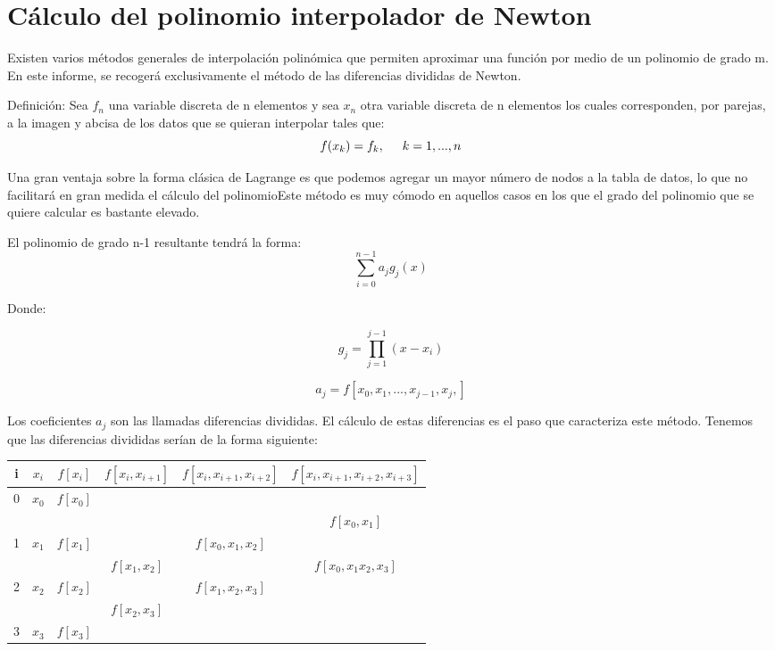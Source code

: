 \section{Cálculo del polinomio interpolador de Newton}
\label{2:sec:2}
  Existen varios métodos generales de interpolación polinómica que permiten aproximar una función por medio de un polinomio de grado m. En este informe, se recogerá exclusivamente el método de las diferencias divididas de Newton.\par Definición: Sea $f_{n}$  una variable discreta de n  elementos y sea $x_{n}$ otra variable discreta de n elementos los cuales corresponden, por parejas, a la imagen y abcisa de los datos que se quieran interpolar tales que:
  \[f(x_{k})=f_{k}, \hspace{0.5 cm} k=1,...,n\]\par
  Una gran ventaja sobre la forma clásica de Lagrange es que podemos agregar un mayor número de nodos a la tabla de datos, lo que no facilitará en gran medida el cálculo del polinomioEste método es muy cómodo en aquellos casos en los que el grado del polinomio que se quiere calcular es bastante elevado.\par El polinomio de grado n-1  resultante tendrá la forma:
  \[\sum_{i=0}^{n-1} {a_j}{g_j}(x)\]\par Donde:\par \[ g_{j}=\prod_{j=1}^{j-1}{(x-x_{i})}\]\par
  \[ a_{j}=f[x_{0},x_{1},...,x_{j-1},x_{j},]\]\par Los coeficientes $a_{j}$ son las llamadas diferencias divididas. El cálculo de estas diferencias es el paso que caracteriza este método. Tenemos que las diferencias divididas serían de la forma siguiente:\par
  
  \begin{tabular}{|c|c|c|c|c|c|}
     \hline
     i & $x_{i}$ & $f[x_{i}]$ & $f[x_{i},x_{i+1}]$ & $f[x_{i}, x_{i+1}, x_{i+2}]$ & $f[x_{i},x_{i+1}, x_{i+2}, x_{i+3}]$ \\
     \hline
     0 & $x_{0}$ & $f[x_{0}]$ & & &\\
       &         &            & & & $f[x_{0},x_{1}]$ \\
     1 & $x_{1}$ & $f[x_{1}]$ & & $f[x_{0},x_{1},x_{2}]$ & \\
       & & & $f[x_{1},x_{2}]$ & & $f[x_{0},x_{1}x_{2},x_{3}]$ \\
     2 & $x_{2}$ & $f[x_{2}]$ & & $f[x_{1},x_{2},x_{3}]$ & \\
       & & & $f[x_{2},x_{3}]$ & & \\
     3 & $x_{3}$ & $f[x_{3}]$ & & & \\
     \hline
  \end{tabular}